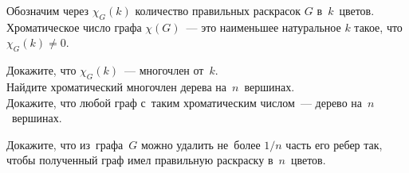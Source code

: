 Обозначим через $\chi_G(k)$ количество правильных раскрасок $G$ в~$k$~цветов.
Хроматическое число графа $\chi(G)$~--- это наименьшее натуральное $k$ такое,
что $\chi_G(k) \neq 0$.

\begin{problems}

\item
\sbp
Докажите, что $\chi_G(k)$~--- многочлен от~$k$.
\\
\sbp
Найдите хроматический многочлен дерева на~$n$~вершинах.
\\
\sbp
Докажите, что любой граф с~таким хроматическим числом~--- дерево
на~$n$~вершинах.

\item
Докажите, что из~графа~$G$ можно удалить не~более $1 / n$ часть его ребер так,
чтобы полученный граф имел правильную раскраску в~$n$~цветов.

\end{problems}


